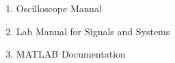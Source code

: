 \begin{enumerate}
    \item Oscilloscope Manual
    \item Lab Manual for Signals and Systems
    \item MATLAB Documentation
\end{enumerate}